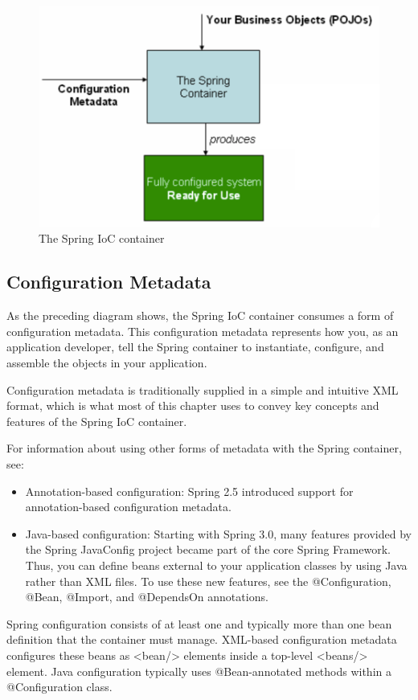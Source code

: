 \begin{figure}[ht]
    \centering
    \includegraphics[width=0.6\linewidth]{./Figure/IMG_process.png}
    \caption{The Spring IoC container}\label{Fig:xd1}
  \end{figure}


\subsection{Configuration Metadata}
As the preceding diagram shows, the Spring IoC container consumes a form of configuration
metadata. This configuration metadata represents how you, as an application developer, tell the
Spring container to instantiate, configure, and assemble the objects in your application.

Configuration metadata is traditionally supplied in a simple and intuitive XML format, which is
what most of this chapter uses to convey key concepts and features of the Spring IoC container.

For information about using other forms of metadata with the Spring container, see:

\begin{itemize}
    \item Annotation-based configuration: Spring 2.5 introduced support for annotation-based
    configuration metadata.
    \item  Java-based configuration: Starting with Spring 3.0, many features provided by the Spring
    JavaConfig project became part of the core Spring Framework. Thus, you can define beans
    external to your application classes by using Java rather than XML files. To use these new
    features, see the @Configuration, @Bean, @Import, and @DependsOn annotations.
\end{itemize}

Spring configuration consists of at least one and typically more than one bean definition that the
container must manage. XML-based configuration metadata configures these beans as <bean/>
elements inside a top-level <beans/> element. Java configuration typically uses @Bean-annotated
methods within a @Configuration class.

